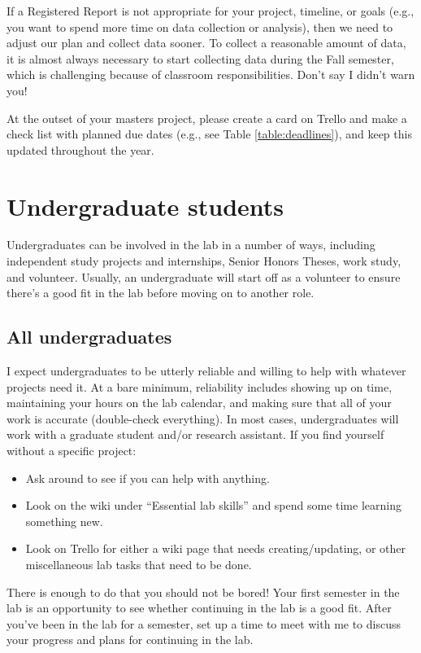 \documentclass[letterpaper,12pt,oneside]{memoir}
\begin{document}
If a Registered Report is not appropriate for your project, timeline, or goals (e.g., you want to spend more time on data collection or analysis), then we need to adjust our plan and collect data sooner. To collect a reasonable amount of data, it is almost always necessary to start collecting data during the Fall semester, which is challenging because of classroom responsibilities. Don't say I didn't warn you!

At the outset of your masters project, please create a card on Trello and make a check list with planned due dates (e.g., see Table \ref{table:deadlines}), and keep this updated throughout the year.

\section{Undergraduate students}

Undergraduates can be involved in the lab in a number of ways, including independent study projects and internships, Senior Honors Theses, work study, and volunteer. Usually, an undergraduate will start off as a volunteer to ensure there's a good fit in the lab before moving on to another role.

\subsection{All undergraduates}

I expect undergraduates to be utterly reliable and willing to help with whatever projects need it. At a bare minimum, reliability includes showing up on time, maintaining your hours on the lab calendar, and making sure that all of your work is accurate (double-check everything). In most cases, undergraduates will work with a graduate student and/or research assistant. If you find yourself without a specific project:

\begin{itemize}
\item Ask around to see if you can help with anything.
\item Look on the wiki under ``Essential lab skills'' and spend some time learning something new.
\item Look on Trello for either a wiki page that needs creating/updating, or other miscellaneous lab tasks that need to be done.
\end{itemize}

There is enough to do that you should not be bored! Your first semester in the lab is an opportunity to see whether continuing in the lab is a good fit. After you've been in the lab for a semester, set up a time to meet with me to discuss your progress and plans for continuing in the lab. 
\end{document}
